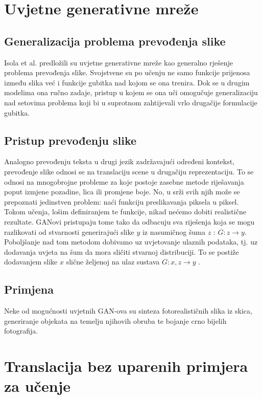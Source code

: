 \documentclass[lmodern, utf8, seminar]{fer}
\begin{document}
\chapter{Uvjetne generativne mreže}
\section{Generalizacija problema prevođenja slike}
Isola et al. \cite{isola2017image} predložili su uvjetne generativne mreže kao generalno rješenje problema prevođenja slike. Svojstvene su po učenju ne samo funkcije prijenosa između slika već i funkcije gubitka nad kojom se ona trenira.
Dok se u drugim modelima ona ručno zadaje, pristup u kojem se ona uči omogučuje generalizaciju nad setovima problema koji bi u suprotnom zahtijevali vrlo drugačije formulacije gubitka.
\newline

\section{Pristup prevođenju slike}
Analogno prevođenju teksta u drugi jezik zadržavajući određeni kontekst, prevođenje slike odnosi se na translaciju scene u drugačiju reprezentaciju. To se odnosi na mnogobrojne probleme za koje postoje zasebne metode riješavanja poput izmjene pozadine, lica ili promjene boje. No, u srži svih njih može se prepoznati jedinstven problem: naći funkciju preslikavanja piksela u piksel. Tokom učenja, lošim definiranjem te funkcije, nikad nećemo dobiti realistične rezultate. GANovi pristupaju tome tako da odbacuju sva riješenja koja se mogu razlikovati od stvarnosti generirajući slike $y$ iz nasumičnog šuma $z$ : $G: z \rightarrow y$. Poboljšanje nad tom metodom dobivamo uz uvjetovanje ulaznih podataka, tj. uz dodavanja uvjeta na šum da mora sličiti stvarnoj distribuciji. To se postiže dodavanjem slike $x$ slične željenoj na ulaz sustava $G: {x,z} \rightarrow y$ \cite{isola2017image}.

\section{Primjena}
Neke od mogućnosti uvjetnih GAN-ova su sinteza fotorealističnih slika iz skica, generiranje objekata na temelju njihovih obruba te bojanje crno bijelih fotografija.



\chapter{Translacija bez uparenih primjera za učenje}
\end{document}
